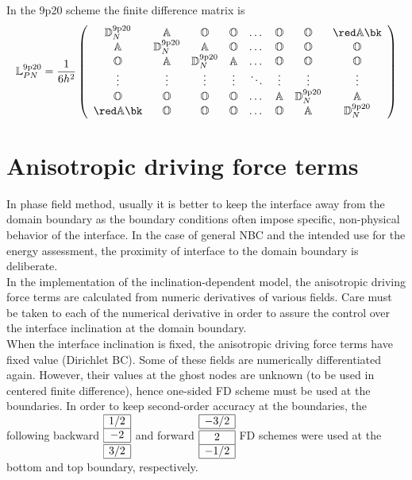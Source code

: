 In the 9p20 scheme the finite difference matrix is
\begin{equation}
	\mathbb{L}^{\mathrm{9p20}}_{PN} = \frac{1}{6h^2}\left(\begin{array}{cccccccccc}
		\mathbb{D}^\mathrm{9p20}_N & \mathbb{A} & \mathbb{O}&\mathbb{O}& \dots&\mathbb{O}&\mathbb{O} &\red \mathbb{A}\bk\\
		\mathbb{A}&\mathbb{D}^\mathrm{9p20}_N & \mathbb{A} & \mathbb{O}& \dots&\mathbb{O}&\mathbb{O}&\mathbb{O}\\
		\mathbb{O}&\mathbb{A}&\mathbb{D}^\mathrm{9p20}_N & \mathbb{A} &  \dots&\mathbb{O}&\mathbb{O}&\mathbb{O}\\
		\vdots&\vdots&\vdots&\vdots&\ddots &\vdots&\vdots&\vdots\\
		\mathbb{O}&\mathbb{O}&\mathbb{O}&\mathbb{O}&\dots &\mathbb{A}&\mathbb{D}^\mathrm{9p20}_N & \mathbb{A} \\
		\red \mathbb{A}\bk&\mathbb{O}&\mathbb{O}&\mathbb{O}&\dots &\mathbb{O}&\mathbb{A}&\mathbb{D}^\mathrm{9p20}_N
	\end{array}\right)
\end{equation}

\section{Anisotropic driving force terms}
In phase field method, usually it is better to keep the interface away from the domain boundary as the boundary conditions often impose specific, non-physical behavior of the interface.  In the case of general NBC and the intended use for the energy assessment, the proximity of interface to the domain boundary is deliberate.\\
In the implementation of the inclination-dependent model, the anisotropic driving force terms are calculated from numeric derivatives of various fields. Care must be taken to each of the numerical derivative in order to assure the control over the interface inclination at the domain boundary. \\
When the interface inclination is fixed, the anisotropic driving force terms have fixed value (Dirichlet BC). Some of these fields are numerically differentiated again. However, their values at the ghost nodes are unknown (to be used in centered finite difference), hence one-sided FD scheme must be used at the boundaries. In order to keep second-order accuracy at the boundaries, the following backward $\begin{array}{|c|}
	\hline 1/2 \\ \hline -2 \\ \hline\hline 3/2 \\ \hline
\end{array}$ and forward $\begin{array}{|c|}
	\hline -3/2 \\ \hline\hline 2 \\ \hline -1/2 \\ \hline
\end{array}$ FD schemes were used at the bottom and top boundary, respectively.

